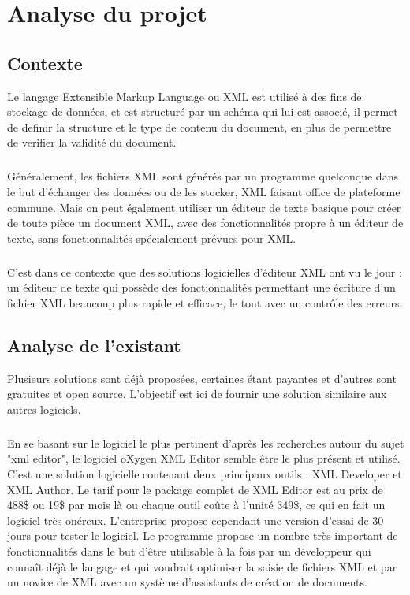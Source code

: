 \chapter{Analyse du projet}
\section{Contexte}
Le langage Extensible Markup Language ou XML est utilisé à des fins de stockage de données, et est structuré par un schéma qui lui est associé, il permet de definir la structure et le type de contenu du document, en plus de permettre de verifier la validité du document.
\paragraph{}

Généralement, les fichiers XML sont générés par un programme quelconque dans le but d'échanger des données ou de les stocker, XML faisant office de plateforme commune. Mais on peut également utiliser un éditeur de texte basique pour créer de toute pièce un document XML, avec des fonctionnalités propre à un éditeur de texte, sans fonctionnalités spécialement prévues pour XML.
\paragraph{}

C'est dans ce contexte que des solutions logicielles d'éditeur XML ont vu le jour : un éditeur de texte qui possède des fonctionnalités permettant une écriture d'un fichier XML beaucoup plus rapide et efficace, le tout avec un contrôle des erreurs.
	
\section{Analyse de l'existant}
Plusieurs solutions sont déjà proposées, certaines étant payantes et d'autres sont gratuites et open source. L'objectif est ici de fournir une solution similaire aux autres logiciels.
\paragraph{}

En se basant sur le logiciel le plus pertinent d'après les recherches autour du sujet "xml editor", le logiciel oXygen XML Editor semble être le plus présent et utilisé. C'est une solution logicielle contenant deux principaux outils : XML Developer et XML Author. Le tarif pour le package complet de XML Editor est au prix de 488\$ ou 19\$ par mois là ou chaque outil coûte à l'unité 349\$, ce qui en fait un logiciel très onéreux. L'entreprise propose cependant une version d'essai de 30 jours pour tester le logiciel. Le programme propose un nombre très important de fonctionnalités dans le but d'être utilisable à la fois par un développeur qui connaît déjà le langage et qui voudrait optimiser la saisie de fichiers XML et par un novice de XML avec un système d'assistants de création de documents.
